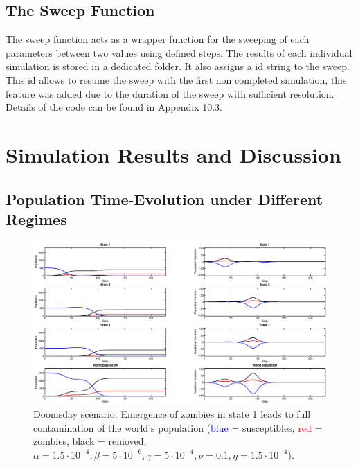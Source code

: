 \documentclass[11pt]{article} %
\begin{document}
\subsection{The Sweep Function}\indent

The sweep function acts as a wrapper function for the sweeping of each parameters between two values using defined steps. The results of each individual simulation is stored in a dedicated folder. It also assigns a id string to the sweep. This id allows to resume the sweep with the first non completed simulation, this feature was added due to the duration of the sweep with sufficient resolution. Details of the code can be found in Appendix 10.3.
\newpage
\section{Simulation Results and Discussion}\indent

\subsection{Population Time-Evolution under Different Regimes}\indent
 
\begin{figure}[h!]
\centerline{
\includegraphics[scale=0.35]{Images/example_doomsday.eps}}
\caption{Doomsday scenario. Emergence of zombies in state 1 leads to full contamination of the world's population (\textcolor{blue}{blue} = susceptibles, \textcolor{red}{red} = zombies, black = removed, $\alpha=1.5\cdot10^{-4}, \beta=5\cdot10^{-6}, \gamma=5\cdot10^{-4}, \nu=0.1, \eta=1.5\cdot10^{-4}$). \label{doomsday} }
\end{figure}
\end{document}
